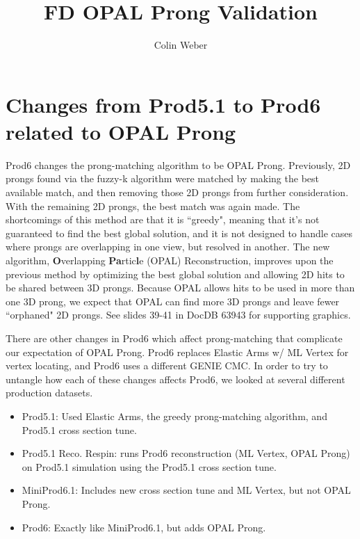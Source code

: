 \documentclass{article}
\title{FD OPAL Prong Validation}
\author{Colin Weber}
\begin{document}
\maketitle

\section{Changes from Prod5.1 to Prod6 related to OPAL Prong}
Prod6 changes the prong-matching algorithm to be OPAL Prong. Previously, 2D prongs found via the fuzzy-k algorithm were matched by making the best available match, and then removing those 2D prongs from further consideration. With the remaining 2D prongs, the best match was again made. The shortcomings of this method are that it is ``greedy", meaning that it's not guaranteed to find the best global solution, and it is not designed to handle cases where prongs are overlapping in one view, but resolved in another. The new algorithm, \textbf{O}verlapping \textbf{Pa}rtic\textbf{l}e (OPAL) Reconstruction, improves upon the previous method by optimizing the best global solution and allowing 2D hits to be shared between 3D prongs. Because OPAL allows hits to be used in more than one 3D prong, we expect that OPAL can find more 3D prongs and leave fewer ``orphaned" 2D prongs. See slides 39-41 in DocDB 63943 \cite{63943} for supporting graphics.

There are other changes in Prod6 which affect prong-matching that complicate our expectation of OPAL Prong. Prod6 replaces Elastic Arms w/ ML Vertex for vertex locating, and Prod6 uses a different GENIE CMC. In order to try to untangle how each of these changes affects Prod6, we looked at several different production datasets.
\begin{itemize}
    \item Prod5.1: Used Elastic Arms, the greedy prong-matching algorithm, and Prod5.1 cross section tune.
    \item Prod5.1 Reco. Respin: runs Prod6 reconstruction (ML Vertex, OPAL Prong) on Prod5.1 simulation using the Prod5.1 cross section tune.
    \item MiniProd6.1: Includes new cross section tune and ML Vertex, but not OPAL Prong.
    \item Prod6: Exactly like MiniProd6.1, but adds OPAL Prong.
\end{itemize}
\end{document}
